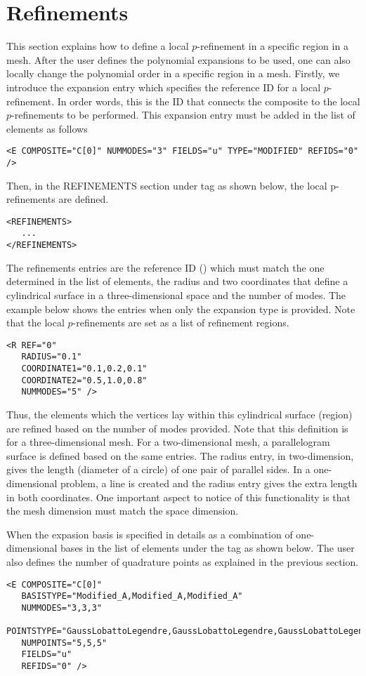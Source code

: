\section{Refinements}
This section explains how to define a local $p$-refinement in a specific region in a mesh. After the user defines the polynomial expansions to be used, one can also locally change the polynomial order in a specific region in a mesh. Firstly, we introduce the expansion entry  which specifies the reference ID for a local $p$-refinement. In order words, this is the ID that connects the composite to the local $p$-refinements to be performed. This expansion entry must be added in the list of  elements as follows
\begin{lstlisting}[style=XMLStyle]
<E COMPOSITE="C[0]" NUMMODES="3" FIELDS="u" TYPE="MODIFIED" REFIDS="0" />
\end{lstlisting}
Then, in the REFINEMENTS section under  tag as shown below, the local p-refinements are defined.
\begin{lstlisting}[style=XMLStyle]
<REFINEMENTS>
   ...
</REFINEMENTS>
\end{lstlisting}

The refinements entries are the reference ID () which must match the one determined in the list of elements, the radius and two coordinates that define a cylindrical surface in a three-dimensional space and the number of modes. The example below shows the entries when only  the expansion type is provided.  Note that the local $p$-refinements are set as a list of  refinement regions.
\begin{lstlisting}[style=XMLStyle]
<R REF="0" 
   RADIUS="0.1" 
   COORDINATE1="0.1,0.2,0.1" 
   COORDINATE2="0.5,1.0,0.8" 
   NUMMODES="5" />
\end{lstlisting}
Thus, the elements which the vertices lay within this cylindrical surface (region) are refined based on the number of modes provided.  Note that this definition is for a three-dimensional mesh. For a two-dimensional mesh, a parallelogram surface is defined based on the same entries. The radius entry, in two-dimension, gives the length (diameter of a circle) of one pair of parallel sides. In a one-dimensional problem, a line is created and the radius entry gives the extra length in both coordinates. One important aspect to notice of this functionality is that the mesh dimension must match the space dimension.

When the expasion basis is specified in details as a combination of one-dimensional bases in the list of elements under the  tag as shown below. The user also defines the number of quadrature points as explained in the previous section.
\begin{lstlisting}[style=XMLStyle]
<E COMPOSITE="C[0]" 
   BASISTYPE="Modified_A,Modified_A,Modified_A" 
   NUMMODES="3,3,3" 
   POINTSTYPE="GaussLobattoLegendre,GaussLobattoLegendre,GaussLobattoLegendre" 
   NUMPOINTS="5,5,5" 
   FIELDS="u" 
   REFIDS="0" />
\end{lstlisting}

